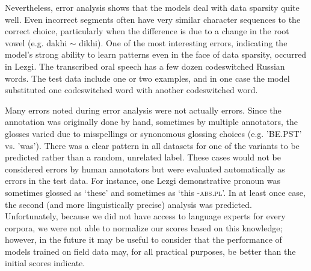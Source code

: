 

Nevertheless, error analysis shows that the models deal with data sparsity quite well. Even incorrect segments often have very similar character sequences to the correct choice, particularly when the difference is due to a change in the root vowel (e.g. dakhi $\sim$ dikhi). One of the most interesting errors, indicating the model's strong ability to learn patterns even in the face of data sparsity, occurred in Lezgi. The transcribed oral speech has a few dozen codeswitched Russian words. The test data include one or two examples, and in one case the model substituted one codeswitched word with another codeswitched word. 

Many errors noted during error analysis were not actually errors. Since the annotation was originally done by hand, sometimes by multiple annotators, the glosses varied due to misspellings or synonomous glossing choices (e.g. 'BE.PST' vs. 'was'). There was a clear pattern in all datasets for one of the variants to be predicted rather than a random, unrelated label. These cases would not be considered errors by human annotators but were evaluated automatically as errors in the test data. For instance, one Lezgi demonstrative pronoun was sometimes glossed as `these' and sometimes as `this \textsc{-abs.pl}'. In at least once case, the second (and more linguistically precise) analysis was predicted. Unfortunately, because we did not have access to language experts for every corpora, we were not able to normalize our scores based on this knowledge; however, in the future it may be useful to consider that the performance of models trained on field data may, for all practical purposes, be better than the initial scores indicate.

